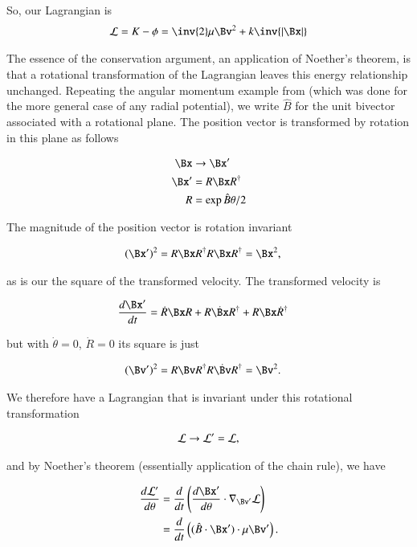 So, our Lagrangian is
\begin{align*}
\LL = K - \phi = \inv{2} \mu \Bv^2 + k \inv{\Abs{\Bx}}
\end{align*}

The essence of the conservation argument, an application of 
Noether's theorem,
is that a rotational transformation of the Lagrangian leaves this energy relationship unchanged.  Repeating 
the angular momentum example from  (which was done for the more general case of any radial potential), we 
write $\hat{B}$ for the unit bivector associated with a rotational plane.  The position vector is transformed by rotation in this plane as follows

\begin{align*}
\Bx &\rightarrow \Bx' \\
\Bx' &= R \Bx R^\dagger \\
R &= \exp{\hat{B}\theta/2}
\end{align*}

The magnitude of the position vector is rotation invariant

\begin{align*}
(\Bx')^2 &= R \Bx R^\dagger R \Bx R^\dagger = \Bx^2,
\end{align*}

as is our the square of the transformed velocity.  The transformed velocity is

\begin{align*}
\frac{d\Bx'}{dt} &= \dot{R} \Bx R + R \dot{\Bx} R^\dagger + R \Bx \dot{R}^\dagger
\end{align*}

but with $\dot{\theta} = 0$, $\dot{R} = 0$ its square is just

\begin{align*}
(\Bv')^2 &= R {\Bv} R^\dagger R \dot{\Bv} R^\dagger = \Bv^2.
\end{align*}

We therefore have a Lagrangian that is invariant under this rotational transformation

\begin{align*}
\mathcal{L} \rightarrow \mathcal{L}' = \mathcal{L},
\end{align*}

and by Noether's theorem (essentially application of the chain rule), we have

\begin{align*}
\frac{d\LL'}{d\theta}
&= \frac{d}{dt} \left(\frac{d\Bx'}{d\theta} \cdot \grad_{\Bv'} \LL \right) \\
&= \frac{d}{dt} \left( (\hat{B} \cdot \Bx') \cdot \mu \Bv' \right).
\end{align*}

